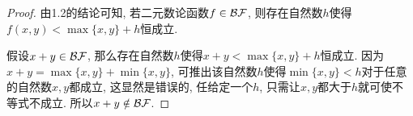 \begin{proof}
由1.2的结论可知, 若二元数论函数$f\in\mathcal{BF}$, 则存在自然数$h$使得$f(x,y)<\max\{x,y\}+h$恒成立.

假设$x+y\in\mathcal{BF}$, 那么存在自然数$h$使得$x+y<\max\{x,y\}+h$恒成立. 因为$x+y=\max\{x,y\}+\min\{x,y\}$, 可推出该自然数$h$使得$\min\{x,y\}<h$对于任意的自然数$x,y$都成立, 这显然是错误的, 任给定一个$h$, 只需让$x,y$都大于$h$就可使不等式不成立. 所以$x+y\notin\mathcal{BF}$.
\end{proof}